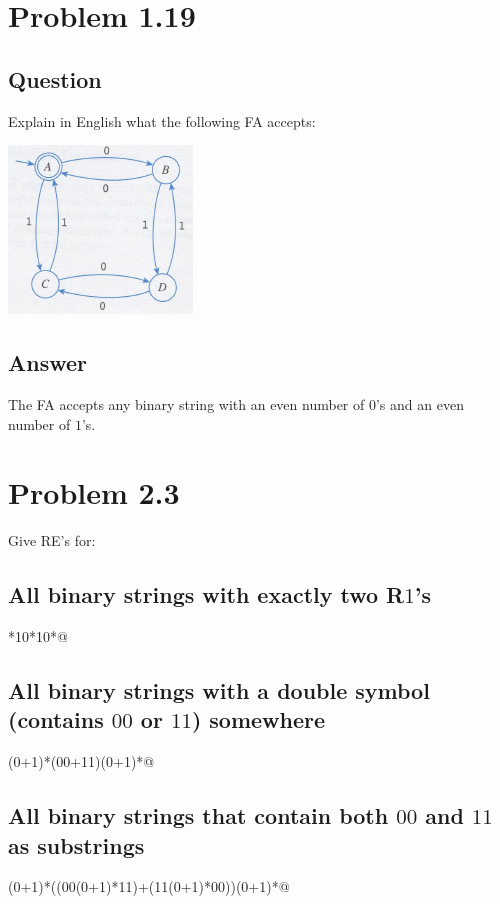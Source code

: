 \documentclass[12pt, a4paper]{article}
\begin{document}
\section{Problem 1.19}
\subsection{Question}
Explain in English what the following FA accepts:
\begin{center}
\includegraphics[scale=1]{1.19-problem}
\end{center}
\subsection{Answer}
The FA accepts any binary string with an even number of $0$'s and an even number of $1$'s.

\section{Problem 2.3}
Give RE's for:
\subsection{All binary strings with exactly two R$1$'s}
\begin{center}
*10*10*@
\end{center}
\subsection{All binary strings with a double symbol (contains $00$ or $11$) somewhere}
\begin{center}
\verb@(0+1)*(00+11)(0+1)*@
\end{center}
\subsection{All binary strings that contain both $00$ and $11$ as substrings}
\begin{center}
\verb@(0+1)*((00(0+1)*11)+(11(0+1)*00))(0+1)*@
\end{center}
\end{document}
